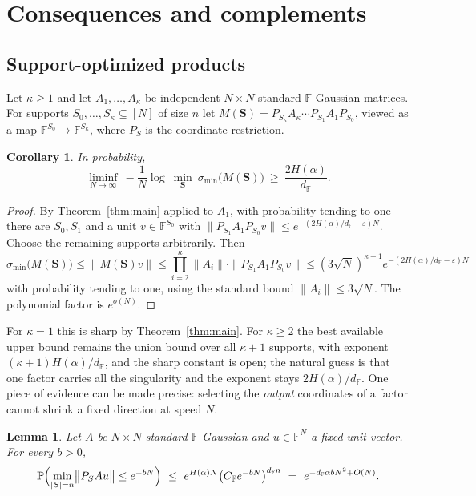 \documentclass[11pt,reqno]{amsart}
\theoremstyle{plain}
\newtheorem{corollary}[theorem]{Corollary}
\newtheorem{lemma}[theorem]{Lemma}
\theoremstyle{definition}
\theoremstyle{remark}
\newcommand{\F}{\mathbb{F}}
\newcommand{\PP}{\mathbb{P}}
\newcommand{\smin}{\sigma_{\min}}
\newcommand{\dF}{d_{\F}}
\begin{document}
\section{Consequences and complements}\label{sec:conseq}

\subsection{Support-optimized products}
Let $\kappa\ge1$ and let $A_1,\dots,A_\kappa$ be independent $N\times N$ standard $\F$-Gaussian
matrices. For supports $S_0,\dots,S_\kappa\subseteq[N]$ of size $n$ let
$M(\mathbf S)=P_{S_\kappa}A_\kappa\cdots P_{S_1}A_1P_{S_0}$, viewed as a map $\F^{S_0}\to
\F^{S_\kappa}$, where $P_S$ is the coordinate restriction.

\begin{corollary}\label{cor:products}
In probability,
\[
  \liminf_{N\to\infty}\ -\frac1N\log\ \min_{\mathbf S}\ \smin\bigl(M(\mathbf S)\bigr)
  \ \ge\ \frac{2H(\alpha)}{\dF}.
\]
\end{corollary}

\begin{proof}
By Theorem~\ref{thm:main} applied to $A_1$, with probability tending to one there are $S_0,S_1$ and
a unit $v\in\F^{S_0}$ with $\|P_{S_1}A_1P_{S_0}v\|\le e^{-(2H(\alpha)/\dF-\varepsilon)N}$. Choose
the remaining supports arbitrarily. Then
\[
  \smin\bigl(M(\mathbf S)\bigr)\le\|M(\mathbf S)v\|
  \le\prod_{i=2}^{\kappa}\|A_i\|\cdot\|P_{S_1}A_1P_{S_0}v\|
  \le(3\sqrt N)^{\kappa-1}e^{-(2H(\alpha)/\dF-\varepsilon)N}
\]
with probability tending to one, using the standard bound $\|A_i\|\le3\sqrt N$. The polynomial
factor is $e^{o(N)}$.
\end{proof}

For $\kappa=1$ this is sharp by Theorem~\ref{thm:main}. For $\kappa\ge2$ the best available upper
bound remains the union bound over all $\kappa+1$ supports, with exponent
$(\kappa+1)H(\alpha)/\dF$, and the sharp constant is open; the natural guess is that one factor
carries all the singularity and the exponent stays $2H(\alpha)/\dF$. One piece of evidence can be
made precise: selecting the \emph{output} coordinates of a factor cannot shrink a fixed direction
at speed $N$.

\begin{lemma}\label{lem:outputselect}
Let $A$ be $N\times N$ standard $\F$-Gaussian and $u\in\F^N$ a fixed unit vector. For every $b>0$,
\[
  \PP\Bigl(\min_{|S|=n}\bigl\|P_SAu\bigr\|\le e^{-bN}\Bigr)\ \le\
  e^{H(\alpha)N}\bigl(C_\F e^{-bN}\bigr)^{\dF n}\ =\ e^{-\dF\alpha bN^2+O(N)} .
\]
\end{lemma}
\end{document}
